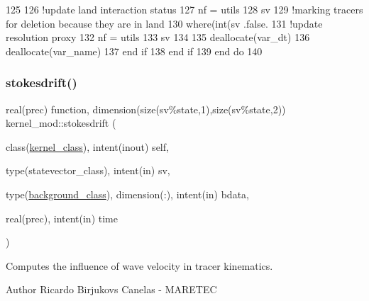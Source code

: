 \begin{DoxyCode}
125 
126                 \textcolor{comment}{!update land interaction status}
127                 nf = utils%
128                 sv%
129                 \textcolor{comment}{!marking tracers for deletion because they are in land}
130                 \textcolor{keywordflow}{where}(int(sv%
      .false.
131                 \textcolor{comment}{!update resolution proxy}
132                 nf = utils%
133                 sv%
134 
135                 \textcolor{keyword}{deallocate}(var\_dt)
136                 \textcolor{keyword}{deallocate}(var\_name)
137 \textcolor{keywordflow}{            end if}
138 \textcolor{keywordflow}{        end if}
139 \textcolor{keywordflow}{    end do}
140 
\end{DoxyCode}
\mbox{\label{namespacekernel__mod_a69811135e6a881c537873c59451f689e}} 
\subsubsection{\texorpdfstring{stokesdrift()}{stokesdrift()}}
{\footnotesize\ttfamily real(prec) function, dimension(size(sv\%state,1),size(sv\%state,2)) kernel\+\_\+mod\+::stokesdrift (\begin{DoxyParamCaption}\item[{class(\mbox{\hyperlink{structkernel__mod_1_1kernel__class}{kernel\+\_\+class}}), intent(inout)}]{self,  }\item[{type(statevector\+\_\+class), intent(in)}]{sv,  }\item[{type(\mbox{\hyperlink{structbackground__mod_1_1background__class}{background\+\_\+class}}), dimension(\+:), intent(in)}]{bdata,  }\item[{real(prec), intent(in)}]{time }\end{DoxyParamCaption})}



Computes the influence of wave velocity in tracer kinematics. 

\begin{DoxyAuthor}{Author}
Ricardo Birjukovs Canelas -\/ M\+A\+R\+E\+T\+EC 
\end{DoxyAuthor}

